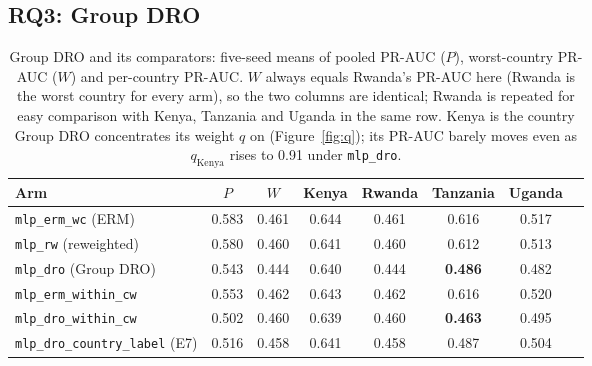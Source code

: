 \documentclass[11pt]{article}
\newcommand{\arm}[1]{\texttt{#1}}
\begin{document}
\subsection{RQ3: Group DRO}

\begin{table}[H]
  \centering
  \small
  \caption{Group DRO and its comparators: five-seed means of pooled PR-AUC ($P$), worst-country PR-AUC ($W$) and per-country PR-AUC. $W$ always equals Rwanda's PR-AUC here (Rwanda is the worst country for every arm), so the two columns are identical; Rwanda is repeated for easy comparison with Kenya, Tanzania and Uganda in the same row. Kenya is the country Group DRO concentrates its weight $q$ on (Figure~\ref{fig:q}); its PR-AUC barely moves even as $q_{\text{Kenya}}$ rises to 0.91 under \arm{mlp\_dro}.}
  \label{tab:e3}
  \begin{tabular}{lccccccc}
    \toprule
    Arm & $P$ & $W$ & Kenya & Rwanda & Tanzania & Uganda \\
    \midrule
    \arm{mlp\_erm\_wc} (ERM)         & 0.583 & 0.461 & 0.644 & 0.461 & 0.616 & 0.517 \\
    \arm{mlp\_rw} (reweighted)       & 0.580 & 0.460 & 0.641 & 0.460 & 0.612 & 0.513 \\
    \arm{mlp\_dro} (Group DRO)       & 0.543 & 0.444 & 0.640 & 0.444 & \textbf{0.486} & 0.482 \\
    \arm{mlp\_erm\_within\_cw}       & 0.553 & 0.462 & 0.643 & 0.462 & 0.616 & 0.520 \\
    \arm{mlp\_dro\_within\_cw}       & 0.502 & 0.460 & 0.639 & 0.460 & \textbf{0.463} & 0.495 \\
    \arm{mlp\_dro\_country\_label} (E7) & 0.516 & 0.458 & 0.641 & 0.458 & 0.487 & 0.504 \\
    \bottomrule
  \end{tabular}
\end{table}
\end{document}
